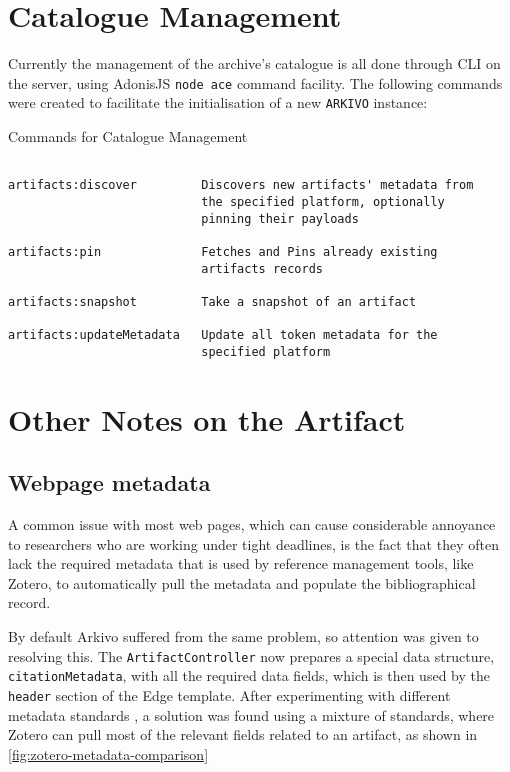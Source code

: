 \section{Catalogue Management}

Currently the management of the archive's catalogue is all done through CLI on the server, using AdonisJS \texttt{node ace} command facility.
The following commands were created to facilitate the initialisation of a new \texttt{ARKIVO} instance:



\begin{VerbatimEnv}[H]
  \caption{Commands for Catalogue Management}
  \label{verb:cli-management}
  \footnotesize
  \begin{verbatim}

artifacts:discover         Discovers new artifacts' metadata from
                           the specified platform, optionally
                           pinning their payloads

artifacts:pin              Fetches and Pins already existing
                           artifacts records

artifacts:snapshot         Take a snapshot of an artifact

artifacts:updateMetadata   Update all token metadata for the
                           specified platform
\end{verbatim}
\end{VerbatimEnv}



\section{Other Notes on the Artifact}

\subsection{Webpage metadata}

A common issue with most web pages, which can cause considerable annoyance to researchers who are working under tight deadlines, is the fact that they often lack the required metadata that is used by reference management tools, like Zotero, to automatically pull the metadata and populate the bibliographical record.

By default Arkivo suffered from the same problem, so attention was given to resolving this.
The \texttt{ArtifactController} now prepares a special data structure, \texttt{citationMetadata}, with all the required data fields, which is then used by the \texttt{header} section of the Edge template.
After experimenting with different metadata standards \cite{DevExposing_metadataZotero}\cite{zahidOpenGraphMeta2023} , a solution was found using a mixture of standards, where Zotero can pull most of the relevant fields related to an artifact, as shown in \autoref{fig:zotero-metadata-comparison}


